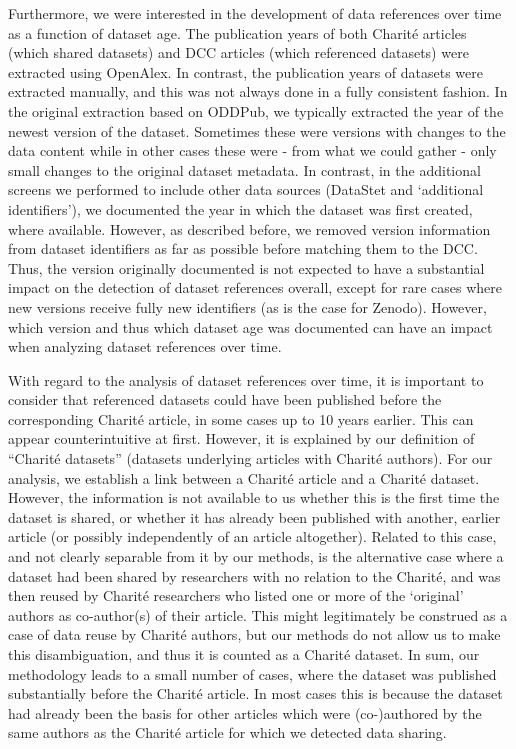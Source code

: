 \documentclass[
  letterpaper,
  DIV=11,
  numbers=noendperiod]{scrartcl}
\begin{document}
Furthermore, we were interested in the development of data references
over time as a function of dataset age. The publication years of both
Charité articles (which shared datasets) and DCC articles (which
referenced datasets) were extracted using OpenAlex. In contrast, the
publication years of datasets were extracted manually, and this was not
always done in a fully consistent fashion. In the original extraction
based on ODDPub, we typically extracted the year of the newest version
of the dataset. Sometimes these were versions with changes to the data
content while in other cases these were - from what we could gather -
only small changes to the original dataset metadata. In contrast, in the
additional screens we performed to include other data sources (DataStet
and `additional identifiers'), we documented the year in which the
dataset was first created, where available. However, as described
before, we removed version information from dataset identifiers as far
as possible before matching them to the DCC. Thus, the version
originally documented is not expected to have a substantial impact on
the detection of dataset references overall, except for rare cases where
new versions receive fully new identifiers (as is the case for Zenodo).
However, which version and thus which dataset age was documented can
have an impact when analyzing dataset references over time.

With regard to the analysis of dataset references over time, it is
important to consider that referenced datasets could have been published
before the corresponding Charité article, in some cases up to 10 years
earlier. This can appear counterintuitive at first. However, it is
explained by our definition of ``Charité datasets'' (datasets underlying
articles with Charité authors). For our analysis, we establish a link
between a Charité article and a Charité dataset. However, the
information is not available to us whether this is the first time the
dataset is shared, or whether it has already been published with
another, earlier article (or possibly independently of an article
altogether). Related to this case, and not clearly separable from it by
our methods, is the alternative case where a dataset had been shared by
researchers with no relation to the Charité, and was then reused by
Charité researchers who listed one or more of the `original' authors as
co-author(s) of their article. This might legitimately be construed as a
case of data reuse by Charité authors, but our methods do not allow us
to make this disambiguation, and thus it is counted as a Charité
dataset. In sum, our methodology leads to a small number of cases, where
the dataset was published substantially before the Charité article. In
most cases this is because the dataset had already been the basis for
other articles which were (co-)authored by the same authors as the
Charité article for which we detected data sharing.
\end{document}
